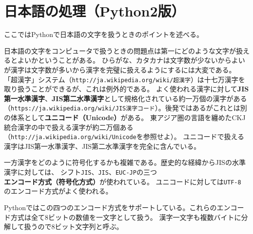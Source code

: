 \documentclass[a4j,12pt,makeidx]{jbook}
\begin{document}
\chapter{日本語の処理（Python2版）}
ここではPythonで日本語の文字を扱うときのポイントを述べる。\par
日本語の文字をコンピュータで扱うときの問題点は第一にどのような文字が扱えるとよいかということがある。
ひらがな、カタカナは文字数が少ないからよいが漢字は文字数が多いから漢字を完璧に扱えるようにするには大変である。
「超漢字」システム（{\verb"http://ja.wikipedia.org/wiki/超漢字"}）は十七万漢字を取り扱うことができるが、これは例外的である。
よく使われる漢字に対して{\bf JIS第一水準漢字}、{\bf JIS第二水準漢字}として規格化されている約一万個の漢字がある
（{\verb"https://ja.wikipedia.org/wiki/JIS漢字コード"}）。後発ではあるがこれとは別の体系として{\bf ユニコード（Unicode）}がある。
東アジア圏の言語を纏めたCKJ統合漢字の中で扱える漢字が約二万個ある（{\verb"http://ja.wikipedia.org/wiki/Unicode"}を参照せよ）。
ユニコードで扱える漢字はJIS第一水準漢字、JIS第二水準漢字を完全に含んでいる。\par
一方漢字をどのように符号化するかも複雑である。歴史的な経緯からJISの水準漢字に対しては、
シフト{\tt JIS}、{\tt JIS}、{\tt EUC-JP}の三つ{\bf エンコード方式（符号化方式）}が使われている。
ユニコードに対しては{\tt UTF-8} のエンコード方式がよく使われる。\par
Pythonではこの四つのエンコード方式をサポートしている。これらのエンコード方式は全て8ビットの数値を一文字として扱う。
漢字一文字も複数バイトに分解して扱うので8ビット文字列と呼ぶ。
%
\end{document}

